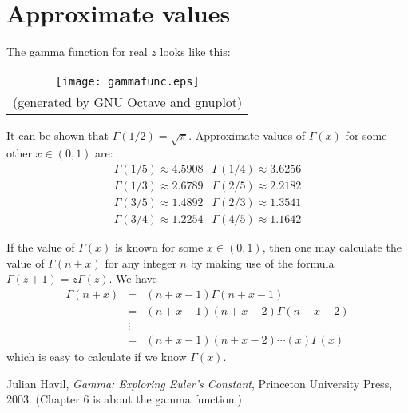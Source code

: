 \documentclass{article}
\begin{document}
\section*{Approximate values}

The gamma function for real $z$ looks like this:
\begin{center}
\begin{tabular}{c}
\texttt{[image: gammafunc.eps]} \\
{\tiny (generated by GNU Octave and gnuplot) }
\end{tabular}
\end{center}

It can be shown that $\Gamma(1/2)=\sqrt{\pi}$.
Approximate values of $\Gamma(x)$ for some other $x\in(0,1)$ are:
\[
  \begin{array}{cc}
  \Gamma(1/5) \approx 4.5908 & \Gamma(1/4) \approx 3.6256 \\
  \Gamma(1/3) \approx 2.6789 & \Gamma(2/5) \approx 2.2182 \\
  \Gamma(3/5) \approx 1.4892 & \Gamma(2/3) \approx 1.3541 \\
  \Gamma(3/4) \approx 1.2254 & \Gamma(4/5) \approx 1.1642 
  \end{array}
\]

If the value of $\Gamma(x)$ is known for some $x\in(0,1)$,
then one may calculate the value of $\Gamma(n+x)$ for any integer $n$
by making use of the formula $\Gamma(z+1)=z\Gamma(z)$.
We have
\begin{eqnarray*}
  \Gamma(n+x) & = & (n+x-1)\Gamma(n+x-1) \\
  & = & (n+x-1)(n+x-2)\Gamma(n+x-2) \\
  & \vdots & \\
  & = & (n+x-1)(n+x-2)\cdots(x)\Gamma(x) 
\end{eqnarray*}
which is easy to calculate if we know $\Gamma(x)$.

\begin{thebibliography}{9}
 Julian Havil,
 {\it Gamma: Exploring Euler's Constant},
 Princeton University Press, 2003.
 (Chapter 6 is about the gamma function.)
\end{thebibliography}
\end{document}
